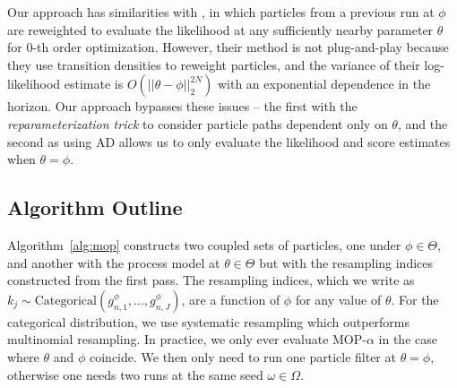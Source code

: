 \documentclass[numsec,webpdf,modern,medium,namedate]{oup-authoring-template}
\theoremstyle{thmstyleone}%
\theoremstyle{thmstyletwo}%
\theoremstyle{thmstylethree}%
\begin{document}
Our approach has similarities with \cite{svensson18}, in which particles from a previous run at $\phi$ are reweighted to evaluate the likelihood at any sufficiently nearby parameter $\theta$ for $0$-th order optimization.
However, their method is not plug-and-play because they use transition densities to reweight particles, and the variance of their log-likelihood estimate is $O(||\theta - \phi||_2^{2N})$ with an exponential dependence in the horizon. Our approach bypasses these issues -- the first with the \textit{reparameterization trick} to consider particle paths dependent only on $\theta$, and the second as using AD allows us to only evaluate the likelihood and score estimates when $\theta=\phi$. 





\subsection{Algorithm Outline} 

Algorithm~\ref{alg:mop} constructs two coupled sets of particles, one under $\phi \in \Theta$, and another with the process model at $\theta \in \Theta$ but with the resampling indices constructed from the first pass.
The resampling indices, which we write as $k_j \sim \text{Categorical}(g^{\phi}_{n,1},...,g^{\phi}_{n,J})$, are a function of $\phi$ for any value of $\theta$.
For the categorical distribution, we use systematic resampling \citep{arulampalam02,king16} which outperforms multinomial resampling.
In practice, we only ever evaluate MOP-$\alpha$ in the case where $\theta$ and $\phi$ coincide. We then only need to run one particle filter at $\theta=\phi$, otherwise one needs two runs at the same seed $\omega \in \Omega$.
\end{document}
